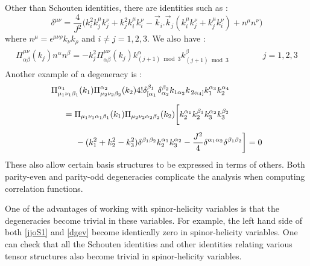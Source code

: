 \documentclass[a4paper,11pt]{article}
\newcommand{\be}{\begin{equation}}
\newcommand{\ee}{\end{equation}}
\begin{document}
Other than Schouten identities, there are identities such as \cite{Bzowski:2013sza} :
%
\be\label{degen}
\delta^{\mu \nu}= \frac{4}{J^2}\Big( k_i^2 k_j^{\mu} k_j^{\nu} + k_j^2 k_i^{\mu} k_i^{\nu}-\vec{k}_i . \vec{k}_j(k_i^{\mu} k_j^{\nu}+k_j^{\mu} k_i^{\nu})+n^{\mu}n^{\nu}  \Big)
\ee
where $n^{\mu}=\epsilon^{\mu \nu \rho}k_{\nu}k_{\rho}$ and $i \ne j=1,2,3$. We also have \cite{Bzowski:2013sza} :
\begin{align}\label{eid}
\begin{array}{l}
\Pi_{\alpha \beta}^{\mu \nu}\left(k_{j}\right) n^{\alpha} n^{\beta}=-k_{j}^{2} \Pi_{\alpha \beta}^{\mu \nu}\left(k_{j}\right) k_{(j+1) \bmod 3}^{\alpha} k_{(j+1) \bmod 3}^{\beta} \quad\quad\quad\quad j =1,2,3
\end{array}
\end{align}
Another example of a degeneracy is \cite{Bzowski:2017poo} :
\begin{align}\label{dgev}
    &\Pi_{\mu_1\nu_1\beta_1}^{\alpha_1}(k_1) \Pi_{\mu_2\nu_2\beta_2}^{\alpha_2}(k_2)4!\delta^{\beta_1}_{\left[\alpha_1\right.}\delta^{\beta_2}_{\alpha_2}k_{1\alpha_2}k_{\left.2\alpha_4\right]}k_1^{\alpha_3}k_2^{\alpha_4}\notag\\[5 pt]
    &\hspace{.5cm}=\Pi_{\mu_1\nu_1\alpha_1\beta_1}(k_1) \Pi_{\mu_2\nu_2\alpha_2\beta_2}(k_2)\bigg[k_2^{\alpha_1}k_2^{\beta_1}k_3^{\alpha_2}k_3^{\beta_2}\bigg.\notag\\[5 pt]
    &\hspace{1cm}\bigg. -(k_1^2+k_2^2-k_3^2)\delta^{\beta_1\beta_2}k_2^{\alpha_1}k_3^{\alpha_2}-\frac{J^2}{4}\delta^{\alpha_1\alpha_2}\delta^{\beta_1\beta_2}\bigg]=0
\end{align}
These also allow certain basis structures to be expressed in terms of others. Both parity-even and parity-odd degeneracies complicate the analysis when computing correlation functions. 

One of the advantages of working with spinor-helicity variables is that the degeneracies become trivial in these variables. For example, the left hand side of both \eqref{jjoS1} and \eqref{dgev} become identically zero in spinor-helicity variables. One can check that all the Schouten identities and other identities relating various tensor structures also become trivial in spinor-helicity variables.




\end{document}
